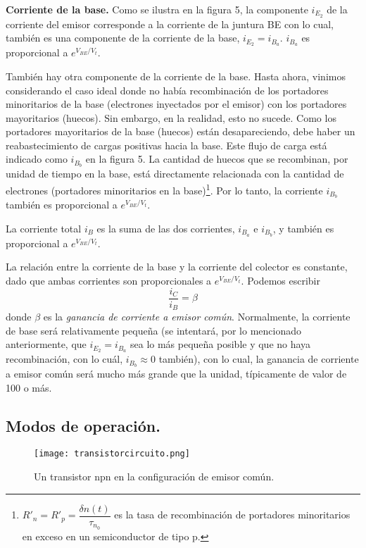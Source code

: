 \documentclass[12pt,a4paper]{article}
\begin{document}
\textbf{Corriente de la base.} Como se ilustra en la figura 5, la componente $i_{E_{2}}$ de la corriente del emisor corresponde a la corriente de la juntura BE con lo cual, también es una componente de la corriente de la base, $i_{E_{2}}=i_{B_{a}}$. $i_{B_{a}}$ es proporcional a $e^{V_{BE}/V_{t}}$.

También hay otra componente de la corriente de la base. Hasta ahora, vinimos considerando el caso ideal donde no había recombinación de los portadores minoritarios de la base (electrones inyectados por el emisor) con los portadores mayoritarios (huecos). Sin embargo, en la realidad, esto no sucede. Como los portadores mayoritarios de la base (huecos) están desapareciendo, debe haber un reabastecimiento de cargas positivas hacia la base. Este flujo de carga está indicado como $i_{B_{b}}$ en la figura 5. La cantidad de huecos que se recombinan, por unidad de tiempo en la base, está directamente relacionada con la cantidad de electrones (portadores minoritarios en la base)\footnote{$R'_{n}=R'_{p}=\dfrac{\delta n(t)}{ \tau _{n_{0}} }$ es la tasa de recombinación de portadores minoritarios en exceso en un semiconductor de tipo p.}. Por lo tanto, la corriente $i_{B_{b}}$ también es proporcional a $e^{V_{BE}/V_{t}}$.

La corriente total $i_{B}$ es la suma de las dos corrientes, $i_{B_{a}}$ e $i_{B_{b}}$, y también es proporcional a $e^{V_{BE}/V_{t}}$.

La relación entre la corriente de la base y la corriente del colector es constante, dado que ambas corrientes son proporcionales a $e^{V_{BE}/V_{t}}$. Podemos escribir
\[ \frac{i_{C}}{i_{B}}=\beta \]
donde $\beta$ es la \emph{ganancia de corriente a emisor común}. Normalmente, la corriente de base será relativamente pequeña (se intentará, por lo mencionado anteriormente, que $i_{E_{2}}=i_{B_{a}}$ sea lo más pequeña posible y que no haya recombinación, con lo cuál, $i_{B_{b}} \approx 0$ también), con lo cual, la ganancia de corriente a emisor común será mucho más grande que la unidad, típicamente de valor de 100 o más.

\subsection{Modos de operación.}

\begin{figure}[ht!]
\begin{center}
\texttt{[image: transistorcircuito.png]}
\caption{Un transistor npn en la configuración de emisor común.}
\end{center}
\end{figure}
\end{document}
